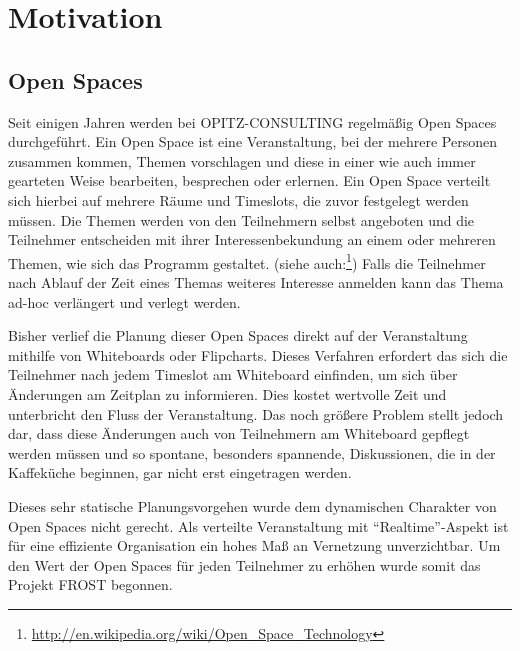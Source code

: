 \chapter{Motivation}
\section{Open Spaces}
Seit einigen Jahren werden bei OPITZ-CONSULTING regelmäßig Open Spaces
durchgeführt. Ein Open Space ist eine Veranstaltung, bei der mehrere Personen
zusammen kommen, Themen vorschlagen und diese in einer wie auch immer gearteten
Weise bearbeiten, besprechen oder erlernen. Ein Open Space verteilt sich hierbei
auf mehrere Räume und Timeslots, die zuvor festgelegt werden müssen. Die Themen
werden von den Teilnehmern selbst angeboten und die Teilnehmer entscheiden mit
ihrer Interessenbekundung an einem oder mehreren Themen, wie sich das Programm
gestaltet. (siehe
auch:\footnote{\url{http://en.wikipedia.org/wiki/Open_Space_Technology}}) Falls
die Teilnehmer nach Ablauf der Zeit eines Themas weiteres Interesse anmelden
kann das Thema ad-hoc verlängert und verlegt werden.

Bisher verlief die Planung dieser Open Spaces direkt auf der Veranstaltung
mithilfe von Whiteboards oder Flipcharts. Dieses Verfahren erfordert das sich
die Teilnehmer nach jedem Timeslot am Whiteboard einfinden, um sich über
Änderungen am Zeitplan zu informieren. Dies kostet wertvolle Zeit und
unterbricht den Fluss der Veranstaltung. Das noch größere Problem stellt jedoch
dar, dass diese Änderungen auch von Teilnehmern am Whiteboard gepflegt werden
müssen und so spontane, besonders spannende, Diskussionen, die in der Kaffeküche
beginnen, gar nicht erst eingetragen werden.

Dieses sehr statische Planungsvorgehen wurde dem dynamischen Charakter von Open
Spaces nicht gerecht. Als verteilte Veranstaltung mit ``Realtime''-Aspekt ist
für eine effiziente Organisation ein hohes Maß an Vernetzung unverzichtbar. Um
den Wert der Open Spaces für jeden Teilnehmer zu erhöhen wurde somit das Projekt
FROST begonnen.

